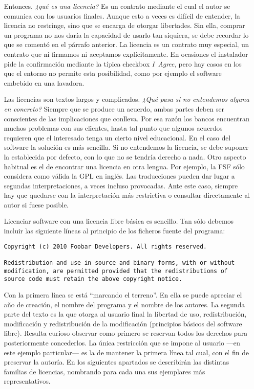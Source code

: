 Entonces, \emph{¿qué es una licencia?} Es un contrato mediante el cual
el autor se comunica con los usuarios finales. Aunque esto a veces es
difícil de entender, la licencia no restringe, sino que se encarga de
otorgar libertades. Sin ella, comprar un programa no nos daría la
capacidad de usarlo tan siquiera, se debe recordar lo que se comentó
en el párrafo anterior. La licencia es un contrato muy especial, un
contrato que ni firmamos ni aceptamos explícitamente. En ocasiones el
instalador pide la confirmación mediante la típica checkbox
\emph{I~Agree}, pero hay casos en los que el entorno no permite esta
posibilidad, como por ejemplo el software embebido en una lavadora.

Las licencias son textos largos y complicados. \emph{¿Qué pasa si no
  entendemos alguna en concreto?} Siempre que se produce un acuerdo,
ambas partes deben ser conscientes de las implicaciones que
conlleva. Por esa razón los bancos encuentran muchos problemas con sus
clientes, hasta tal punto que algunos acuerdos requieren que el
interesado tenga un cierto nivel educacional. En el caso del software
la solución es más sencilla. Si no entendemos la licencia, se debe
suponer la establecida por defecto, con lo que no se tendría derecho a
nada. Otro aspecto habitual es el de encontrar una licencia en otra
lengua. Por ejemplo, la FSF sólo considera como válida la GPL en
inglés. Las traducciones pueden dar lugar a segundas interpretaciones,
a veces incluso provocadas. Ante este caso, siempre hay que quedarse
con la interpretación más restrictiva o consultar directamente al
autor si fuese posible.

Licenciar software con una licencia libre básica es sencillo. Tan sólo
debemos incluir las siguiente líneas al principio de los ficheros
fuente del programa:
\begin{verbatim}
Copyright (c) 2010 Foobar Developers. All rights reserved.

Redistribution and use in source and binary forms, with or without
modification, are permitted provided that the redistributions of
source code must retain the above copyright notice.
\end{verbatim}
Con la primera línea se está ``marcando el terreno''. En ella se puede
apreciar el año de creación, el nombre del programa y el nombre de los
autores. La segunda parte del texto es la que otorga al usuario final
la libertad de uso, redistribución, modificación y redistribución de
la modificación (principios básicos del software libre). Resulta
curioso observar como primero se reservan todos los derechos para
posteriormente concederlos. La única restricción que se impone al
usuario ---en este ejemplo particular--- es la de mantener la primera
línea tal cual, con el fin de preservar la autoría. En los siguientes
apartados se describirán las distintas familias de licencias,
nombrando para cada una sus ejemplares más representativos.

